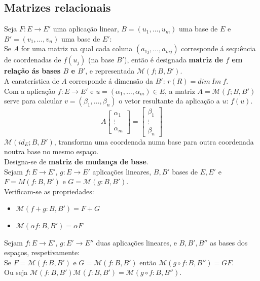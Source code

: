 \documentclass[]{report}
\begin{document}
\subsection{Matrizes relacionais}
Seja $F: E \to E'$ uma aplicação linear, $B=(u_1, \dots, u_m)$ uma base de $E$ e $B'=(v_1, \dots, v_n)$ uma base de $E'$:\\
Se $A$ for uma matriz na qual cada coluna $(a_{1j}, \dots, a_{mj})$ corresponde á sequência de coordenadas de $f(u_j)$ (na base $B'$), então é designada \textbf{matriz de $f$ em relação ás bases $B$ e $B'$}, e representada $\mathcal{M}(f; B, B')$.\\
A caraterística de $A$ corresponde á dimensão da $B'$: $r(R) = dim \> Im \> f$.\\[2mm]
Com a aplicação $f: E \to E'$  e $u = (\alpha_1, \dots, \alpha_m) \in E$, a matriz $A = \mathcal{M}(f; B, B')$ serve para calcular $v = (\beta_1, \dots, \beta_n)$ o vetor resultante da aplicação a $u$: $f(u)$.
$$A
\begin{bmatrix}
\alpha_1 \\ \vdots \\ \alpha_m
\end{bmatrix}
=
\begin{bmatrix}
\beta_1 \\ \vdots \\ \beta_n
\end{bmatrix}$$
$\mathcal{M}(id_E; B, B')$, transforma uma coordenada numa base para outra coordenada noutra base no mesmo espaço.\\
Designa-se de \textbf{matriz de mudança de base}.\\[2mm]
Sejam $f: E \to E'$, $g: E \to E'$ aplicações lineares, $B, B'$ bases de $E, E'$ e $F = M(f: B, B')$ e $G = \mathcal{M}(g: B, B')$.\\
Verificam-se as propriedades:
\begin{itemize}
\item $\mathcal{M}(f + g: B, B') = F + G$
\item $\mathcal{M}(\alpha f: B, B') = \alpha F$
\end{itemize}
\vspace{2mm}
Sejam $f: E \to E'$, $g: E' \to E''$ duas aplicações lineares, e $B, B', B''$ as bases dos espaços, respetivamente:\\
Se $F = \mathcal{M}(f: B, B')$ e $G = \mathcal{M}(f: B, B')$ então $\mathcal{M}(g \circ f: B, B'') = GF$.\\
Ou seja $\mathcal{M}(f: B, B') \mathcal{M}(f: B, B') = \mathcal{M}(g \circ f: B, B'')$.\\[5mm]
\end{document}
